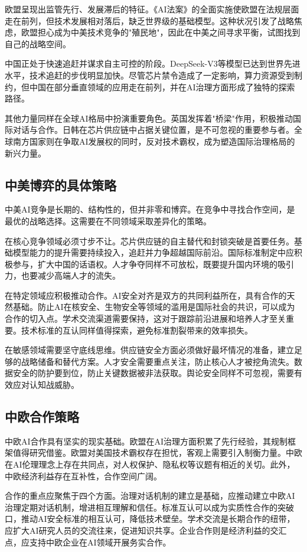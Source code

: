 欧盟呈现出监管先行、发展滞后的特征。《AI法案》的全面实施使欧盟在法规层面走在前列，但技术发展相对落后，缺乏世界级的基础模型。这种状况引发了战略焦虑，欧盟担心成为中美技术竞争的"殖民地"，因此在中美之间寻求平衡，试图找到自己的战略空间。

中国正处于快速追赶并谋求自主可控的阶段。DeepSeek-V3等模型已达到世界先进水平，技术追赶的步伐明显加快。尽管芯片禁令造成了一定影响，算力资源受到制约，但中国在部分垂直领域的应用走在前列，并在AI治理方面形成了独特的探索路径。

其他力量同样在全球AI格局中扮演重要角色。英国发挥着"桥梁"作用，积极推动国际对话与合作。日韩在芯片供应链中占据关键位置，是不可忽视的重要参与者。全球南方国家则在争取AI发展权的同时，反对技术霸权，成为塑造国际治理格局的新兴力量。

\subsection{中美博弈的具体策略}

中美AI竞争是长期的、结构性的，但并非零和博弈。在竞争中寻找合作空间，是最优的战略选择。这需要在不同领域采取差异化的策略。

在核心竞争领域必须寸步不让。芯片供应链的自主替代和封锁突破是首要任务。基础模型能力的提升需要持续投入，追赶并力争超越国际前沿。国际标准制定中应积极参与，扩大中国的话语权。人才争夺同样不可放松，既要提升国内环境的吸引力，也要减少高端人才的流失。

在特定领域应积极推动合作。AI安全对齐是双方的共同利益所在，具有合作的天然基础。防止AI在核安全、生物安全等领域的滥用是国际社会的共识，可以成为合作的切入点。学术交流渠道需要保持，这对于跟踪前沿进展和培养人才至关重要。技术标准的互认同样值得探索，避免标准割裂带来的效率损失。

在敏感领域需要坚守底线思维。供应链安全方面必须做好最坏情况的准备，建立足够的战略储备和替代方案。人才安全需要重点关注，防止核心人才被挖角流失。数据安全的防护要到位，防止关键数据被非法获取。舆论安全同样不可忽视，需要有效应对认知战威胁。

\subsection{中欧合作策略}

中欧AI合作具有坚实的现实基础。欧盟在AI治理方面积累了先行经验，其规制框架值得研究借鉴。欧盟对美国技术霸权存在担忧，客观上需要引入制衡力量。中欧在AI伦理理念上存在共同点，对人权保护、隐私权等议题有相近的关切。此外，中欧经济利益存在互补性，合作空间广阔。

合作的重点应聚焦于四个方面。治理对话机制的建立是基础，应推动建立中欧AI治理定期对话机制，增进相互理解和信任。标准互认可以成为实质性合作的突破口，推动AI安全标准的相互认可，降低技术壁垒。学术交流是长期合作的纽带，应扩大AI研究人员的交流往来，促进知识共享。企业合作则是经济利益的交汇点，应支持中欧企业在AI领域开展务实合作。

